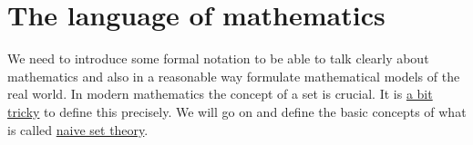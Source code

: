 















































\setcounter{chapter}{0}

\chapter{The language of mathematics}

We need to introduce some formal notation to be able to talk clearly about mathematics and also in a reasonable way
formulate mathematical models of the real world. In modern mathematics the
concept of a set is crucial. It is \href{https://en.wikipedia.org/wiki/Set\_theory\#Axiomatic\_set\_theory}{a bit tricky} to define this precisely.
We will go on and define the basic concepts of what is called
\href{https://en.wikipedia.org/wiki/Naive\_set\_theory}{naive set theory}.


